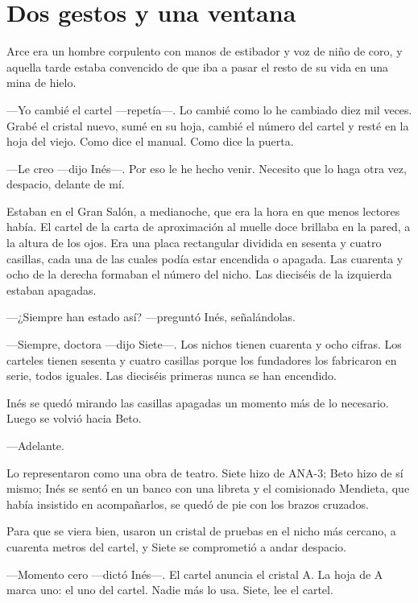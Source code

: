 \chapter{Dos gestos y una ventana}

 Arce era un hombre corpulento con manos de estibador y voz de niño de coro, y aquella tarde estaba convencido de que iba a pasar el resto de su vida en una mina de hielo.

---Yo cambié el cartel ---repetía---\nobreak. Lo cambié como lo he cambiado diez mil veces. Grabé el cristal nuevo, sumé en su hoja, cambié el número del cartel y resté en la hoja del viejo. Como dice el manual. Como dice la puerta.

---Le creo ---dijo Inés---\nobreak. Por eso le he hecho venir. Necesito que lo haga otra vez, despacio, delante de mí.

Estaban en el Gran Salón, a medianoche, que era la hora en que menos lectores había. El cartel de la carta de aproximación al muelle doce brillaba en la pared, a la altura de los ojos. Era una placa rectangular dividida en sesenta y cuatro casillas, cada una de las cuales podía estar encendida o apagada. Las cuarenta y ocho de la derecha formaban el número del nicho. Las dieciséis de la izquierda estaban apagadas.

---¿Siempre han estado así? ---preguntó Inés, señalándolas.

---Siempre, doctora ---dijo Siete---\nobreak. Los nichos tienen cuarenta y ocho cifras. Los carteles tienen sesenta y cuatro casillas porque los fundadores los fabricaron en serie, todos iguales. Las dieciséis primeras nunca se han encendido.

Inés se quedó mirando las casillas apagadas un momento más de lo necesario. Luego se volvió hacia Beto.

---Adelante.

\escena
Lo representaron como una obra de teatro. Siete hizo de ANA-3; Beto hizo de sí mismo; Inés se sentó en un banco con una libreta y el comisionado Mendieta, que había insistido en acompañarlos, se quedó de pie con los brazos cruzados.

Para que se viera bien, usaron un cristal de pruebas en el nicho más cercano, a cuarenta metros del cartel, y Siete se comprometió a andar despacio.

---Momento cero ---dictó Inés---\nobreak. El cartel anuncia el cristal A. La hoja de A marca uno: el uno del cartel. Nadie más lo usa. Siete, lee el cartel.

